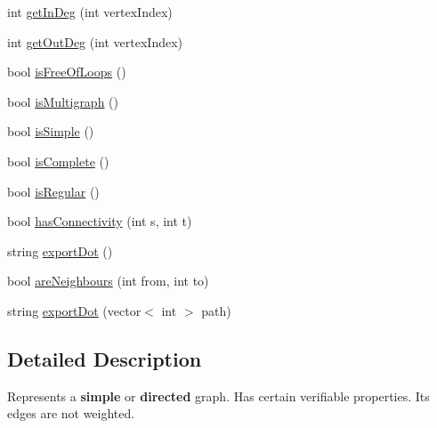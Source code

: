 \begin{DoxyCompactItemize}
\item 
int \hyperlink{class_graph_aa22848281e37e921bf4fc998bcf66295}{get\-In\-Deg} (int vertex\-Index)
\item 
int \hyperlink{class_graph_a1facc5271ce6c09e06bce134ddaac98c}{get\-Out\-Deg} (int vertex\-Index)
\item 
bool \hyperlink{class_graph_a451bbc2d9ddde5e85d6c122a845dbd02}{is\-Free\-Of\-Loops} ()
\item 
bool \hyperlink{class_graph_ab410dec3635c080f04c60c6835d91df6}{is\-Multigraph} ()
\item 
bool \hyperlink{class_graph_a4095f5949d5b2a420ecf2d0f2bb68dc8}{is\-Simple} ()
\item 
bool \hyperlink{class_graph_aba9eba8899f63a67ed270ee00bdfeb4e}{is\-Complete} ()
\item 
bool \hyperlink{class_graph_afe19c30e6b7005fd0c66c5f182764ca5}{is\-Regular} ()
\item 
bool \hyperlink{class_graph_a46cb0098da247fd0f2b07229df8cd5e7}{has\-Connectivity} (int s, int t)
\item 
string \hyperlink{class_graph_aaa3e920d6063f97f1826ced6180962ee}{export\-Dot} ()
\item 
bool \hyperlink{class_graph_ad3689ff1213976a5d738813be6ecee0d}{are\-Neighbours} (int from, int to)
\item 
string \hyperlink{class_graph_a5898714a35ec10f29610e6e06f82c8c8}{export\-Dot} (vector$<$ int $>$ path)
\end{DoxyCompactItemize}


\subsection{Detailed Description}
Represents a {\bfseries simple} or {\bfseries directed} graph. Has certain verifiable properties. Its edges are not weighted. 

